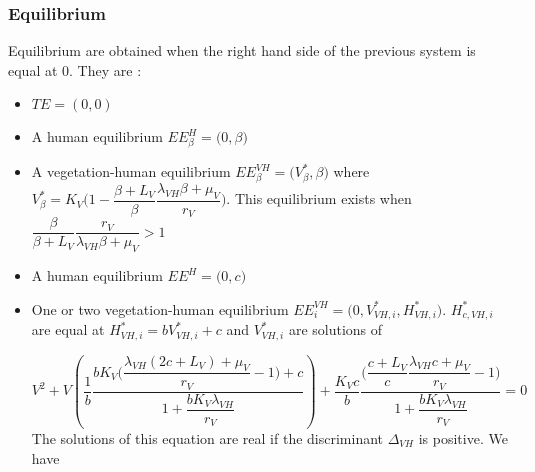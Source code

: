 \documentclass{article}
\newcommand{\lv}{\lambda_{VH}}
\begin{document}
\subsubsection{Equilibrium}
Equilibrium are obtained when the right hand side of the previous system is equal at 0. They are :
\begin{itemize}
\item $TE = (0,0)$
\item A human equilibrium $EE^H_\beta = \Big(0,\beta \Big)$
\item A vegetation-human equilibrium $EE^{VH}_\beta = \Big(V^*_{\beta}, \beta \Big)$ where $V^*_\beta = K_V \Big(1- \dfrac{\beta + L_V}{\beta} \dfrac{\lv \beta + \mu_V}{r_V} \Big)$. This equilibrium exists when $\dfrac{\beta}{\beta + L_V} \dfrac{r_V}{\lv \beta + \mu_V} > 1$
\item A human equilibrium $EE^H = \Big(0,c\Big)$
\item One or two vegetation-human equilibrium $EE^{VH}_i = \Big(0, V^*_{VH,i}, H^*_{VH,i} \Big)$. $H^*_{c, VH,i}$ are equal at $H^*_{VH, i} = bV^*_{VH, i} + c$ and $V^*_{VH,i}$ are solutions of
%
%

\begin{equation}
V^2 + V \left(\dfrac{1}{b} \dfrac{ bK_V\Big(\dfrac{\lv(2c+L_V) + \mu_V}{r_V} - 1\Big) + c}{1 + \dfrac{b K_V \lv}{r_V}}  \right) + \dfrac{K_Vc}{b} \dfrac{\Big(\dfrac{c+L_V}{c} \dfrac{\lv c + \mu_V}{r_V} - 1\Big)}{1 + \dfrac{b K_V \lv}{r_V}} = 0
\label{equilibreVH:equationV}
\end{equation}
The solutions of this equation are real if the discriminant $\Delta_{VH}$ is positive. We have


\end{itemize}
\end{document}
